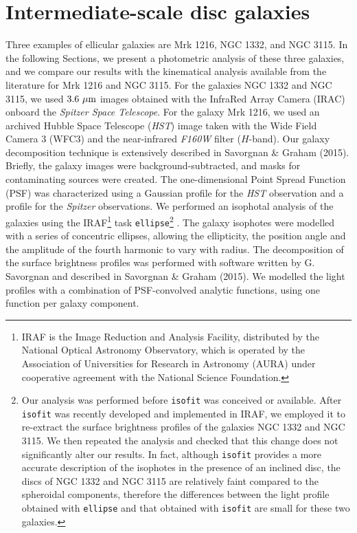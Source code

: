\documentclass[useAMS,usenatbib,article]{mnras}
\begin{document}
\section{Intermediate-scale disc galaxies}
\label{sec:gal}
Three examples of ellicular galaxies are Mrk 1216, NGC 1332, and NGC 3115. 
In the following Sections, we present a photometric analysis of these three galaxies, 
and we compare our results with the kinematical analysis available from the literature for Mrk 1216 and NGC 3115. 
For the galaxies NGC 1332 and NGC 3115, we used $3.6~\rm \mu m$ images obtained with the InfraRed Array Camera (IRAC) 
onboard the \emph{Spitzer Space Telescope}. 
For the galaxy Mrk 1216, we used an archived Hubble Space Telescope (\emph{HST}) image  
taken with the Wide Field Camera 3 (WFC3) and the near-infrared \emph{F160W} filter ($H$-band). 
Our galaxy decomposition technique is extensively described in Savorgnan \& Graham (2015).
Briefly, the galaxy images were background-subtracted, and masks for contaminating sources were created. 
The one-dimensional Point Spread Function (PSF) was characterized using a Gaussian profile for the \emph{HST} observation 
and a \cite{moffat1969} profile for the \emph{Spitzer} observations.
We performed an isophotal analysis of the galaxies using the IRAF\footnote{IRAF 
is the Image Reduction and Analysis Facility, distributed by the National Optical Astronomy Observatory, 
which is operated by the Association of Universities for Research in Astronomy (AURA) 
under cooperative agreement with the National Science Foundation.} task {\tt ellipse}\footnote{Our analysis 
was performed before {\tt isofit} \citep{ciambur2015} was conceived or available. 
After {\tt isofit} was recently developed and implemented in IRAF, 
we employed it to re-extract the surface brightness profiles of the galaxies NGC 1332 and NGC 3115. 
We then repeated the analysis and checked that this change does not significantly alter our results. 
In fact, although {\tt isofit} provides a more accurate description of the isophotes in the presence of an inclined disc, 
the discs of NGC 1332 and NGC 3115 are relatively faint compared to the spheroidal components, 
therefore the differences between the light profile obtained with {\tt ellipse} and that obtained with {\tt isofit} 
are small for these two galaxies. } 
\citep{taskellipse}. 
The galaxy isophotes were modelled with a series of concentric ellipses, 
allowing the ellipticity, the position angle and the amplitude of the fourth harmonic to vary with radius.  
The decomposition of the surface brightness profiles was performed with software written by G. Savorgnan 
and described in Savorgnan \& Graham (2015).
We modelled the light profiles with a combination of PSF-convolved analytic functions, 
using one function per galaxy component. 
\end{document}
